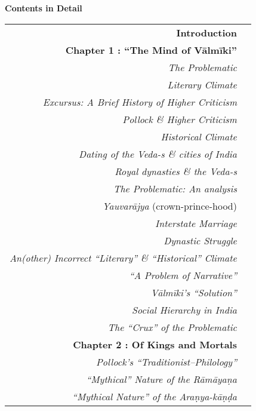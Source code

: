 \thispagestyle{empty}
\hfill{\Large\bf Contents in Detail}

\vskip 40pt

\label{cid}

{\renewcommand{\arraystretch}{1.25}
\begin{longtable}[r]{rr@{}}
{\bf Introduction} & \pageref{introduction}\\[7pt]
{\hfill\bfseries Chapter 1 : “The Mind of Vālmīki”} & \hfill\pageref{chapter1}\\
{\sl The Problematic} & \pageref{sec1.1}\\
{\sl Literary Climate} & \pageref{sec1.1.1}\\
{\sl Excursus: A   Brief History of Higher Criticism} & \pageref{sec1.1.1.1}\\
{\sl Pollock \& Higher Criticism} & \pageref{sec1.1.1.2}\\
{\sl Historical Climate} & \pageref{sec1.1.2}\\
{\sl Dating of the Veda-s \& cities of India} & \pageref{sec1.1.2.1}\\
{\sl Royal dynasties \& the Veda-s} & \pageref{sec1.1.2.3}\\
{\sl The Problematic: An analysis} & \pageref{sec1.2}\\
{\sl Yauvarājya} (crown-prince-hood) & \pageref{sec1.2.1}\\
{\sl Interstate Marriage} & \pageref{sec1.2.2}\\
{\sl Dynastic Struggle} & \pageref{sec1.2.3}\\
{\sl An(other) Incorrect “Literary” \& “Historical” Climate} & \pageref{sec1.2.3.1}\\
{\sl “A Problem of Narrative”} & \pageref{sec1.2.3.2}\\
{\sl Vālmīki’s “Solution”} & \pageref{sec1.3}\\
{\sl Social Hierarchy in India} & \pageref{sec1.3.1}\\
{\sl The “Crux” of the Problematic} & \pageref{sec1.4}\\[7pt]
{\hfill\bfseries Chapter 2 : Of Kings and Mortals} & \hfill\pageref{chapter2}\\
{\sl Pollock’s “Traditionist–Philology”} & \pageref{sec2.1}\\
{\sl “Mythical” Nature of the  Rāmāyaṇa} & \pageref{sec2.2}\\
{\sl “Mythical Nature” of the Araṇya-kāṇḍa} & \pageref{sec2.3}\\

\end{longtable}}
